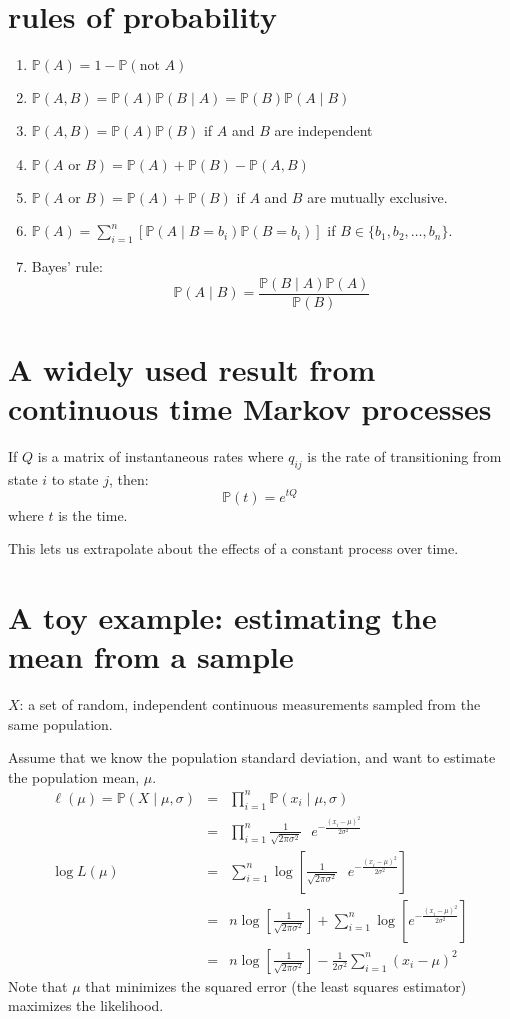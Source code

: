 \documentclass[landscape]{foils}
\renewcommand{\Pr}{\mathbb{P}}
\begin{document}
\section*{rules of probability}
\begin{enumerate}
  \item $\Pr(A) = 1 - \Pr(\mbox{not } A)$
  \item $\Pr(A,B) = \Pr(A)\Pr(B\mid A) = \Pr(B)\Pr(A\mid B)$
  \item $\Pr(A,B) = \Pr(A)\Pr(B)$ if $A$ and $B$ are independent
  \item $\Pr(A\mbox{ or } B) = \Pr(A) + \Pr(B) - \Pr(A,B)$
  \item $\Pr(A\mbox{ or } B) = \Pr(A) + \Pr(B)$ if $A$ and $B$ are mutually exclusive.
  \item $\Pr(A) = \sum_{i=1}^n\left[\Pr(A\mid B=b_i)\Pr(B=b_i)\right]$ if $B \in \{b_1, b_2,\ldots, b_n\}$.
  \item Bayes' rule:$$\Pr(A\mid B) = \frac{\Pr(B\mid A)\Pr(A)}{\Pr(B)}$$
\end{enumerate}

\myNewSlide
\section*{A widely used result from continuous time Markov processes}

If $Q$ is a matrix of instantaneous rates where $q_{ij}$ is the rate
of transitioning from state $i$ to state $j$, then:
$$\Pr(t) = e^{tQ}$$
where $t$ is the time.

This lets us extrapolate about the effects of a constant process over time.

\myNewSlide
\section*{A toy example: estimating the mean from a sample}
$X$: a set of random, independent continuous measurements sampled from the same population.

Assume that we know the population standard deviation, and want to estimate
    the population mean, $\mu$.
\begin{eqnarray*}
  \ell(\mu) = \Pr(X \mid \mu, \sigma) & = & \prod_{i=1}^n\Pr(x_i \mid \mu, \sigma) \\
  & = &  \prod_{i=1}^n\frac{1}{\sqrt{2\pi\sigma^2}}\mbox{ }e^{-\frac{\left(x_i-\mu\right)^2}{2\sigma^2}} \\
\log L(\mu)  & = &  \sum_{i=1}^n\log\left[\frac{1}{\sqrt{2\pi\sigma^2}}\mbox{ }e^{-\frac{\left(x_i-\mu\right)^2}{2\sigma^2}}\right] \\
& = &  n \log\left[\frac{1}{\sqrt{2\pi\sigma^2}}\right] + \sum_{i=1}^n\log\left[e^{-\frac{\left(x_i-\mu\right)^2}{2\sigma^2}}\right] \\
& = &  n \log\left[\frac{1}{\sqrt{2\pi\sigma^2}}\right] - \frac{1}{2\sigma^2} \sum_{i=1}^n\left(x_i-\mu\right)^2
\end{eqnarray*}
Note that $\mu$ that minimizes the squared error (the least squares estimator) maximizes the likelihood.
\end{document}
